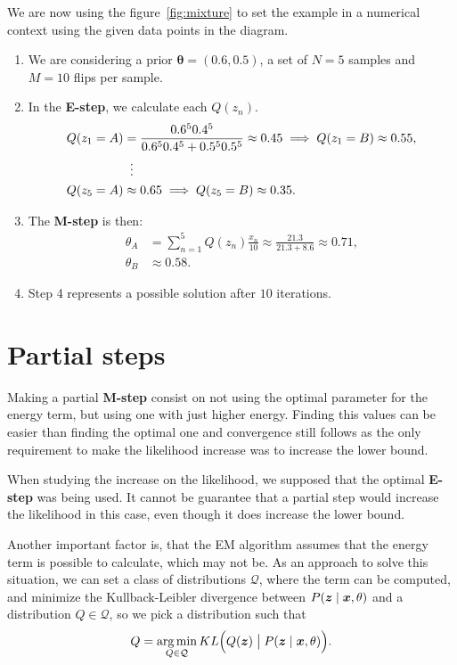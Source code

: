 We are now using the figure~\ref{fig:mixture} to set the example in a numerical context using the given data points in the diagram.
\begin{enumerate}
  \item We are considering a prior \(\bm{\theta} = (0.6, 0.5)\), a set of \(N = 5\) samples and \(M = 10\) flips per sample.
  \item In the \textbf{E-step}, we calculate each \(Q(z_{n})\).
    \[
    \begin{aligned}
      Q(z_{1} = A) &= \frac{0.6^{5} 0.4^{5}}{0.6^{5}0.4^{5} + 0.5^{5}0.5^{5}} \approx 0.45 \implies Q(z_{1} = B) \approx 0.55,\\
      &\mathrel{\makebox[\widthof{=}]{\vdots}} \\
      Q(z_{5} = A) &\approx 0.65 \implies Q(z_{5}=B) \approx 0.35.
    \end{aligned}
    \]
  \item The \textbf{M-step} is then:
    \[
    \begin{aligned}
      \theta_{A} &= \sum_{n=1}^{5}Q(z_{n})\frac{x_{n}}{10} \approx \frac{21.3}{21.3 + 8.6} \approx 0.71,\\
      \theta_{B} &\approx 0.58.
    \end{aligned}
    \]
  \item Step 4 represents a possible solution after \(10\) iterations.
\end{enumerate}


\section{Partial steps}

Making a partial \textbf{M-step} consist on not using the optimal parameter for the energy term, but using one with just higher energy. Finding this values can be easier than finding the optimal one and convergence still follows as the only requirement to make the likelihood increase was to increase the lower bound.

When studying the increase on the likelihood, we supposed that the optimal \textbf{E-step} was being used. It cannot be guarantee that a partial step would increase the likelihood in this case, even though it does increase the lower bound.

Another important factor is, that the EM algorithm assumes that the energy term is possible to calculate, which may not be. As an approach to solve this situation, we can set a class of distributions \(\mathcal{Q}\), where the term can be computed, and minimize the Kullback-Leibler divergence between \(P(\bm{z} \mid \bm{x}, \theta)\) and a distribution \(Q \in \mathcal{Q}\), so we pick a distribution such that
\[
  Q = \operatorname*{arg\,min}_{Q \in \mathcal{Q}} KL\Big(Q(\bm{z}) \bigm| P(\bm{z}\mid \bm{x}, \theta)\Big).
\]

